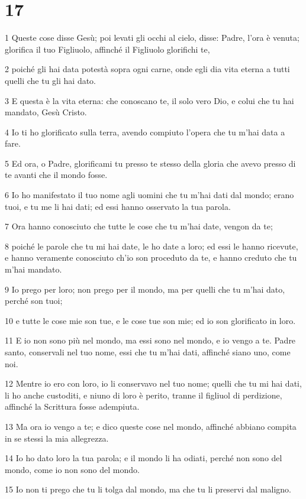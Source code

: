 \chapter{17}

\par 1 Queste cose disse Gesù; poi levati gli occhi al cielo, disse: Padre, l'ora è venuta; glorifica il tuo Figliuolo, affinché il Figliuolo glorifichi te,
\par 2 poiché gli hai data potestà sopra ogni carne, onde egli dia vita eterna a tutti quelli che tu gli hai dato.
\par 3 E questa è la vita eterna: che conoscano te, il solo vero Dio, e colui che tu hai mandato, Gesù Cristo.
\par 4 Io ti ho glorificato sulla terra, avendo compiuto l'opera che tu m'hai data a fare.
\par 5 Ed ora, o Padre, glorificami tu presso te stesso della gloria che avevo presso di te avanti che il mondo fosse.
\par 6 Io ho manifestato il tuo nome agli uomini che tu m'hai dati dal mondo; erano tuoi, e tu me li hai dati; ed essi hanno osservato la tua parola.
\par 7 Ora hanno conosciuto che tutte le cose che tu m'hai date, vengon da te;
\par 8 poiché le parole che tu mi hai date, le ho date a loro; ed essi le hanno ricevute, e hanno veramente conosciuto ch'io son proceduto da te, e hanno creduto che tu m'hai mandato.
\par 9 Io prego per loro; non prego per il mondo, ma per quelli che tu m'hai dato, perché son tuoi;
\par 10 e tutte le cose mie son tue, e le cose tue son mie; ed io son glorificato in loro.
\par 11 E io non sono più nel mondo, ma essi sono nel mondo, e io vengo a te. Padre santo, conservali nel tuo nome, essi che tu m'hai dati, affinché siano uno, come noi.
\par 12 Mentre io ero con loro, io li conservavo nel tuo nome; quelli che tu mi hai dati, li ho anche custoditi, e niuno di loro è perito, tranne il figliuol di perdizione, affinché la Scrittura fosse adempiuta.
\par 13 Ma ora io vengo a te; e dico queste cose nel mondo, affinché abbiano compita in se stessi la mia allegrezza.
\par 14 Io ho dato loro la tua parola; e il mondo li ha odiati, perché non sono del mondo, come io non sono del mondo.
\par 15 Io non ti prego che tu li tolga dal mondo, ma che tu li preservi dal maligno.
